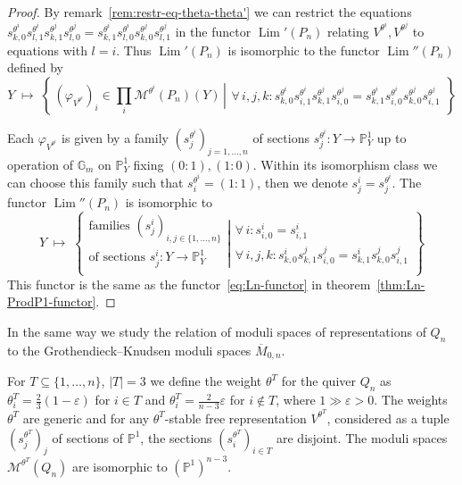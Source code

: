 \documentclass[ALCO,ThmDefs,Unicode,epreuves]{cedram}
\def\phi{\varphi}
\def\G{\mathds G}
\def\P{\mathds P}
\DeclareMathOperator{\Lim}{Lim}
\begin{document}
\begin{proof}
By remark~\ref{rem:restr-eq-theta-theta'} we can restrict the equations 
$s^{\theta^i}_{k,0}s^{\theta^i}_{l,1}s^{\theta^j}_{k,1}s^{\theta^j}_{l,0}
=s^{\theta^i}_{k,1}s^{\theta^i}_{l,0}s^{\theta^j}_{k,0}s^{\theta^j}_{l,1}$
in the functor $\Lim'(P_n)$ relating $V^{\theta^i},V^{\theta^j}$ to equations 
with $l=i$. 
Thus $\Lim'(P_n)$ is isomorphic to the functor $\Lim''(P_n)$ defined by 
\[\textstyle
Y\;\mapsto\;
\left\{\,
(\phi_{V^{\theta^i}})_i\in\prod_i\mathcal M^{\theta^i}(P_n)(Y)
\,\left|
\begin{array}{l}
\forall\,i,j,k\colon
s^{\theta^i}_{k,0}s^{\theta^i}_{i,1}s^{\theta^j}_{k,1}s^{\theta^j}_{i,0}
=s^{\theta^i}_{k,1}s^{\theta^i}_{i,0}s^{\theta^j}_{k,0}s^{\theta^j}_{i,1}
\end{array}\!
\right.\right\}
\]

Each $\phi_{V^{\theta^i}}$ is given by a family $(s^{\theta^i}_j)_{j=1,\ldots,n}$ of 
sections $s^{\theta^i}_j\colon Y\to\P^1_Y$ up to operation of $\G_m$ on $\P^1_Y$ 
fixing $(0:1),(1:0)$.
Within its isomorphism class we can choose this family such that $s_i^{\theta^i}=(1:1)$, 
then we denote $s^i_j=s^{\theta^i}_j$. The functor $\Lim''(P_n)$ is isomorphic to 
\[\textstyle
Y\;\mapsto\;
\left\{
\begin{array}{l}
\text{families $(s^i_j)_{i,j\in\{1,\ldots,n\}}$}\\
\text{of sections $s^i_j\colon Y\to\P^1_Y$}\\
\end{array}
\left|
\begin{array}{l}
\forall\,i\colon s^i_{i,0}=s^i_{i,1}\\
\forall\,i,j,k\colon s^i_{k,0}s^j_{k,1}s^j_{i,0}=s^i_{k,1}s^j_{k,0}s^j_{i,1}
\end{array}
\right.\right\}
\]
This functor is the same as the functor~\eqref{eq:Ln-functor} in 
theorem~\ref{thm:Ln-ProdP1-functor}.
\end{proof}

In the same way we study the relation of moduli spaces of representations 
of $Q_n$ to the Grothendieck--Knudsen moduli spaces $\overline{M}_{0,n}$.


For $T\subseteq\{1,\ldots,n\}$, $|T|=3$ we define the weight $\theta^T$ 
for the quiver $Q_n$ as $\theta^T_i=\frac{2}{3}(1-\varepsilon)$ for 
$i\in T$ and $\theta^T_i=\frac{2}{n-3}\varepsilon$ for $i\not\in T$, 
where $1\gg\varepsilon>0$.
The weights $\theta^T$ are generic and for any $\theta^T$-stable free representation 
$V^{\theta^T}\!$, considered as a tuple $(s^{\theta^T}_j)_j$ of sections of $\P^1$,
the sections $(s^{\theta^T}_i)_{i\in T}$ are disjoint.
The moduli spaces $\mathcal M^{\theta^T}(Q_n)$ are isomorphic to $(\P^1)^{n-3}$.
\end{document}
